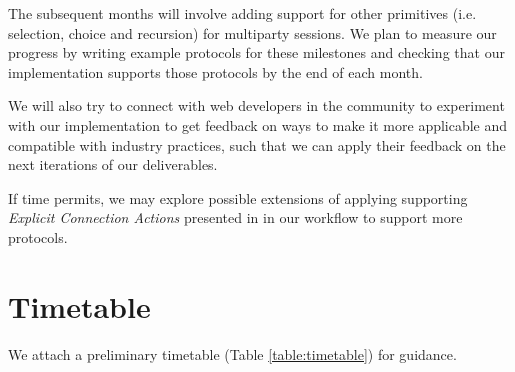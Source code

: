\documentclass[12pt,twoside]{report}
\begin{document}
The subsequent months will involve adding support for other primitives (i.e. selection, choice and recursion) for multiparty sessions. We plan to measure our progress by writing example protocols for these milestones and checking that our implementation supports those protocols by the end of each month.

We will also try to connect with web developers in the community to experiment with our implementation to get feedback on ways to make it more applicable and compatible with industry practices, such that we can apply their feedback on the next iterations of our deliverables.

If time permits, we may explore possible extensions of applying supporting \textit{Explicit Connection Actions} presented in \cite{FASE2017} in our workflow to support more protocols.

\section{Timetable}
We attach a preliminary timetable (Table \ref{table:timetable}) for guidance.
\end{document}
